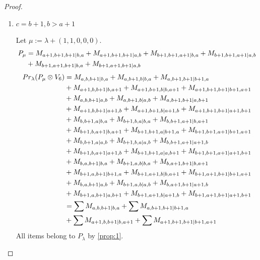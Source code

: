 \begin{proof}
\begin{enumerate}
\begin{enumerate}
        \item $c=b+1, b>a+1$ \par
        Let $\mu:=\lambda + (1,1,0,0,0) $.
        \begin{equation}\notag
          \begin{aligned}
            P_\mu &= M_{a+1,b+1,b+1|b,a}
+ M_{a+1,b+1,b+1|a,b}
+ M_{b+1,b+1,a+1|b,a}
+ M_{b+1,b+1,a+1|a,b}\\
                                               &
+ M_{b+1,a+1,b+1|b,a}
+ M_{b+1,a+1,b+1|a,b}
          \end{aligned}
        \end{equation}
        \begin{equation}\notag
          \begin{aligned}
            Pr_{\lambda}(P_\mu \otimes V_{6}) &=
M_{a,b,b+1|b,a}
+ M_{a,b+1,b|b,a}
+ M_{a,b+1,b+1|b+1,a}\\
                                              &
+ M_{a+1,b,b+1|b,a+1}
+ M_{a+1,b+1,b|b,a+1}
+ M_{a+1,b+1,b+1|b+1,a+1}\\
                                              &
+ M_{a,b,b+1|a,b}
+ M_{a,b+1,b|a,b}
+ M_{a,b+1,b+1|a,b+1}\\
                                              &
+ M_{a+1,b,b+1|a+1,b}
+ M_{a+1,b+1,b|a+1,b}
+ M_{a+1,b+1,b+1|a+1,b+1}\\
                                              &
+ M_{b,b+1,a|b,a}
+ M_{b+1,b,a|b,a}
+ M_{b,b+1,a+1|b,a+1}\\
                                              &
+ M_{b+1,b,a+1|b,a+1}
+ M_{b+1,b+1,a|b+1,a}
+ M_{b+1,b+1,a+1|b+1,a+1}\\
                                              &
+ M_{b,b+1,a|a,b}
+ M_{b+1,b,a|a,b}
+ M_{b,b+1,a+1|a+1,b}\\
                                              &
+ M_{b+1,b,a+1|a+1,b}
+ M_{b+1,b+1,a|a,b+1}
+ M_{b+1,b+1,a+1|a+1,b+1}\\
                                              &
+ M_{b,a,b+1|b,a}
+ M_{b+1,a,b|b,a}
+ M_{b,a+1,b+1|b,a+1}\\
                                              &
+ M_{b+1,a,b+1|b+1,a}
+ M_{b+1,a+1,b|b,a+1}
+ M_{b+1,a+1,b+1|b+1,a+1}\\
                                              &
+ M_{b,a,b+1|a,b}
+ M_{b+1,a,b|a,b}
+ M_{b,a+1,b+1|a+1,b}\\
                                              &
+ M_{b+1,a,b+1|a,b+1}
+ M_{b+1,a+1,b|a+1,b}
+ M_{b+1,a+1,b+1|a+1,b+1} \\
                                               &=
\sum M_{a,b,b+1|b,a}
+ \sum M_{a,b+1,b+1|b+1,a}\\
                                              &
+ \sum M_{a+1,b,b+1|b,a+1}
+ \sum M_{a+1,b+1,b+1|b+1,a+1}
          \end{aligned}
        \end{equation}
All items belong to $P_\lambda$ by \cref{prop:1}.


\end{enumerate}
\end{enumerate}
\end{proof}
